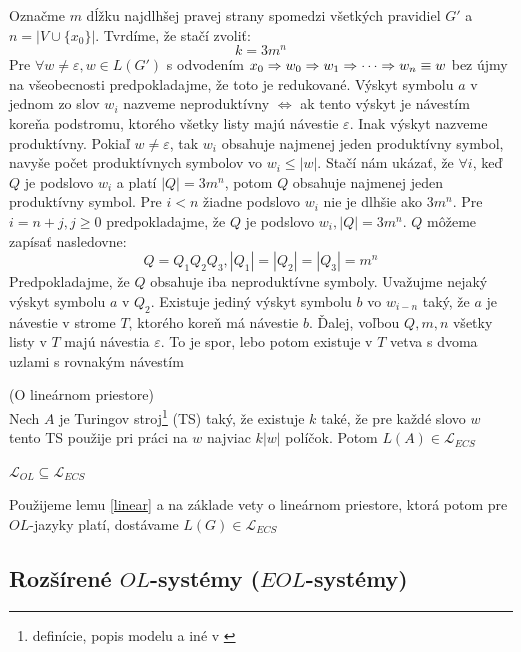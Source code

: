 \begin{dokaz}
    Označme $m$ dĺžku najdlhšej pravej strany spomedzi všetkých
    pravidiel $G'$ a $n=|V\cup\{x_0\}|$. Tvrdíme, že stačí zvoliť:
    \[
    k=3m^n
    \]
    Pre $\forall w\neq\varepsilon,w\in L(G')$ s odvodením $x_0\Rightarrow
    w_0\Rightarrow w_1\Rightarrow\cdots\Rightarrow w_n\equiv w$ bez újmy na všeobecnosti
    predpokladajme, že toto je redukované. Výskyt symbolu $a$ v jednom
    zo slov $w_i$ nazveme neproduktívny $\Longleftrightarrow$ ak tento
    výskyt je návestím koreňa podstromu, ktorého všetky listy majú
    návestie $\varepsilon$. Inak výskyt nazveme produktívny. Pokiaľ
    $w\neq\varepsilon$, tak $w_i$ obsahuje najmenej jeden produktívny
    symbol, navyše počet produktívnych symbolov vo $w_i\leq|w|$. Stačí
    nám ukázať, že $\forall i$, keď $Q$ je podslovo $w_i$ a platí
    $|Q|=3m^n$, potom $Q$ obsahuje najmenej jeden produktívny symbol.
    Pre $i<n$ žiadne podslovo $w_i$ nie je dlhšie ako $3m^n$. Pre
    $i=n+j,j\geq0$ predpokladajme, že $Q$ je podslovo $w_i,|Q|=3m^n$.
    $Q$ môžeme zapísať nasledovne:
    \[
    Q=Q_1Q_2Q_3,|Q_1|=|Q_2|=|Q_3|=m^n
    \]
    Predpokladajme, že $Q$ obsahuje iba neproduktívne symboly.
    Uvažujme nejaký výskyt symbolu $a$ v $Q_2$. Existuje jediný výskyt
    symbolu $b$ vo $w_{i-n}$ taký, že $a$ je návestie v strome $T$,
    ktorého koreň má návestie $b$. Ďalej, voľbou $Q,m,n$ všetky listy
    v $T$ majú návestia $\varepsilon$. To je spor, lebo potom existuje
    v $T$ vetva s dvoma uzlami s rovnakým návestím
\end{dokaz}

\begin{veta}
    (O lineárnom priestore)
    \\ Nech $A$ je Turingov
    stroj\footnote{definície, popis modelu a iné v \cite{Hopc}} (TS)
    taký, že existuje $k$ také, že pre každé slovo $w$ tento TS
    použije pri práci na $w$ najviac $k|w|$ políčok. Potom
    $L(A)\in\mathcal{L}_{ECS}$
\end{veta}

\begin{veta}
    $\mathcal{L}_{OL}\subseteq\mathcal{L}_{ECS}$
\end{veta}

\begin{dokaz}
    Použijeme lemu \ref{linear} a na základe vety o lineárnom
    priestore, ktorá potom pre $OL$-jazyky platí, dostávame
    $L(G)\in\mathcal{L}_{ECS}$
\end{dokaz}

\subsection {Rozšírené $OL$-systémy ($EOL$-systémy)}

